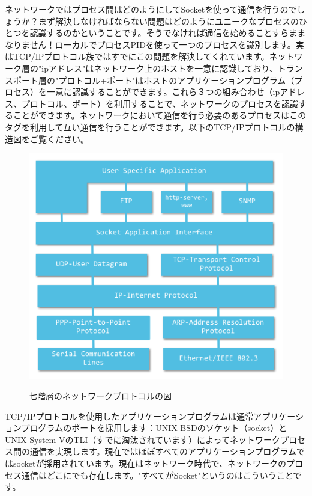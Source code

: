 ネットワークではプロセス間はどのようにしてSocketを使って通信を行うのでしょうか？まず解決しなければならない問題はどのようにユニークなプロセスのひとつを認識するのかということです。そうでなければ通信を始めることすらままなりません！ローカルでプロセスPIDを使って一つのプロセスを識別します。実はTCP/IPプロトコル族ではすでにこの問題を解決してくれています。ネットワーク層の"ipアドレス"はネットワーク上のホストを一意に認識しており、トランスポート層の"プロトコル+ポート"はホストのアプリケーションプログラム（プロセス）を一意に認識することができます。これら３つの組み合わせ（ipアドレス、プロトコル、ポート）を利用することで、ネットワークのプロセスを認識することができます。ネットワークにおいて通信を行う必要のあるプロセスはこのタグを利用して互い通信を行うことができます。以下のTCP/IPプロトコルの構造図をご覧ください。

\begin{figure}[H]
  \includegraphics[width=14cm]{8.1.socket.png}
   \label{図8.1}
   \caption{七階層のネットワークプロトコルの図}
\end{figure}

TCP/IPプロトコルを使用したアプリケーションプログラムは通常アプリケーションプログラムのポートを採用します：UNIX BSDのソケット（socket）とUNIX System VのTLI（すでに淘汰されています）によってネットワークプロセス間の通信を実現します。現在ではほぼすべてのアプリケーションプログラムではsocketが採用されています。現在はネットワーク時代で、ネットワークのプロセス通信はどこにでも存在します。"すべてがSocket"というのはこういうことです。
